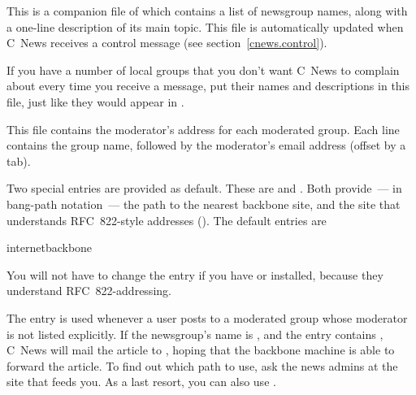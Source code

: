 \documentclass[11pt,makeidx]{report}
\begin{document}
{\newpage
\clearpage
\samepage \begin{dispitems}%
        This is a companion file of  which contains a list
        of newsgroup names, along with a one-line description of its
        main topic.  This file is automatically updated when C~News
        receives a  control message (see
        section~\ref{cnews.control}).

        If you have a number of local groups that you don't want C~News
        to complain about every time you receive a 
        message, put their names and descriptions in this file, just like
        they would appear in .

        This file contains the moderator's address for each moderated
        group. Each line contains the group name, followed by the
        moderator's email address (offset by a tab).

        Two special entries are provided as default. These are
         and . Both provide~--- in
        bang-path notation~--- the path to the nearest backbone site,
        and the site that understands RFC~822-style addresses
        ().  The default entries are

        \begin{tscreen}
	 internet\hspace{6ex}backbone\hspace{6ex}\end{tscreen}

        You will not have to change the  entry if you
        have  or  installed, because they
        understand RFC~822-addressing.

        The  entry is used whenever a user posts to a
        moderated group whose moderator is not listed explicitly.  If
        the newsgroup's name is , and the
         entry contains , C~News
        will mail the article to , hoping
        that the backbone machine is able to forward the article. To
        find out which path to use, ask the news admins at the site that
        feeds you.  As a last resort, you can also use
        .


\end{dispitems}}
\end{document}
